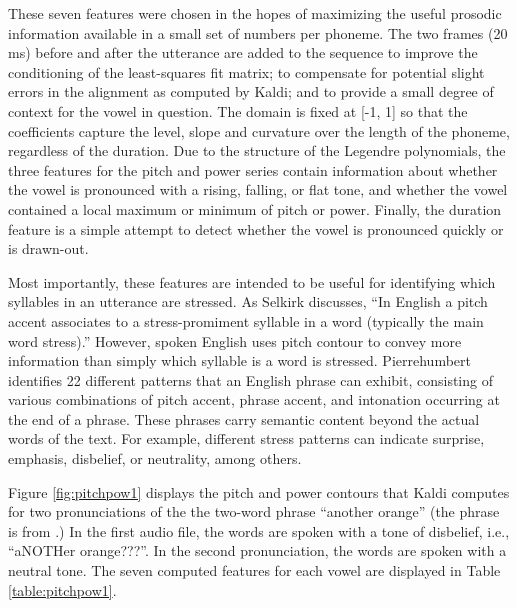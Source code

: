\documentclass{article}
\begin{document}
These seven features were chosen in the hopes of maximizing the useful prosodic information available in a small set of numbers per phoneme.
The two frames (20 ms) before and after the utterance are added to the sequence to improve the conditioning of the least-squares fit matrix; to compensate for potential slight errors in the alignment as computed by Kaldi; and to provide a small degree of context for the vowel in question.
The domain is fixed at [-1, 1] so that the coefficients capture the level, slope and curvature over the length of the phoneme, regardless of the duration.
Due to the structure of the Legendre polynomials, the three features for the pitch and power series contain information about whether the vowel is pronounced with a rising, falling, or flat tone, and whether the vowel contained a local maximum or minimum of pitch or power.
Finally, the duration feature is a simple attempt to detect whether the vowel is pronounced quickly or is drawn-out.

Most importantly, these features are intended to be useful for identifying which syllables in an utterance are stressed. As Selkirk \cite{selkirk1995sentence} discusses, ``In English a pitch accent associates to a stress-promiment syllable in a word (typically the main word stress).''
However, spoken English uses pitch contour to convey more information than simply which syllable is a word is stressed. Pierrehumbert \cite{pierrehumbert1980phonology} identifies 22 different patterns that an English phrase can exhibit, consisting of various combinations of pitch accent, phrase accent, and intonation occurring at the end of a phrase.
These phrases carry semantic content beyond the actual words of the text. For example, different stress patterns can indicate surprise, emphasis, disbelief, or neutrality, among others.

Figure \ref{fig:pitchpow1} displays the pitch and power contours that Kaldi computes for two pronunciations of the the two-word phrase ``another orange'' (the phrase is from \cite{pierrehumbert1980phonology}.) In the first audio file, the words are spoken with a tone of disbelief, i.e., ``aNOTHer orange???''. In the second pronunciation, the words are spoken with a neutral tone. The seven computed features for each vowel are displayed in Table \ref{table:pitchpow1}.
\end{document}
